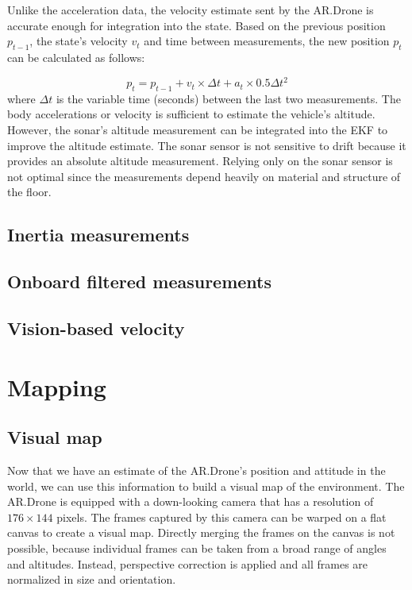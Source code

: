 Unlike the acceleration data, the velocity estimate sent by the AR.Drone is accurate enough for integration into the state.
Based on the previous position $p_{t-1}$, the state's velocity $v_{t}$ and time between measurements, the new position $p_{t}$ can be calculated as follows:

\begin{equation}
p_{t} = p_{t-1} + v_{t} \times \Delta t + a_{t} \times 0.5 \Delta t^2
\end{equation}
where $\Delta t$ is the variable time (seconds) between the last two measurements.
The body accelerations or velocity is sufficient to estimate the vehicle's altitude.
However, the sonar's altitude measurement can be integrated into the EKF to improve the altitude estimate.
The sonar sensor is not sensitive to drift because it provides an absolute altitude measurement.
Relying only on the sonar sensor is not optimal since the measurements depend heavily on material and structure of the floor.


		\subsection{Inertia measurements}
		\subsection{Onboard filtered measurements}
		\subsection{Vision-based velocity}
	\section{Mapping}
		\subsection{Visual map}

Now that we have an estimate of the AR.Drone's position and attitude in the world, we can use this information to build a visual map of the environment.
The AR.Drone is equipped with a down-looking camera that has a resolution of $176 \times 144$ pixels.
The frames captured by this camera can be warped on a flat canvas to create a visual map.
Directly merging the frames on the canvas is not possible, because individual frames can be taken from a broad range of angles and altitudes.
Instead, perspective correction is applied and all frames are normalized in size and orientation.

